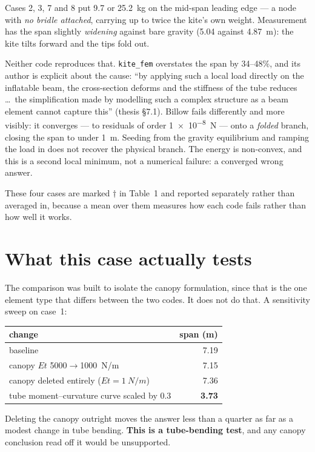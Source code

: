 \documentclass[11pt,a4paper]{article}
\begin{document}
Cases 2, 3, 7 and 8 put \SI{9.7}{} or \SI{25.2}{kg} on the mid-span leading
edge --- a node with \emph{no bridle attached}, carrying up to twice the
kite's own weight. Measurement has the span slightly \emph{widening} against
bare gravity (\SI{5.04}{} against \SI{4.87}{m}): the kite tilts forward and
the tips fold out.

Neither code reproduces that. \texttt{kite\_fem} overstates the span by
34--48\%, and its author is explicit about the cause: ``by applying such a
local load directly on the inflatable beam, the cross-section deforms and the
stiffness of the tube reduces \dots\ the simplification made by modelling such
a complex structure as a beam element cannot capture this'' (thesis \S7.1).
Billow fails differently and more visibly: it converges --- to residuals of
order \SI{1e-8}{N} --- onto a \emph{folded} branch, closing the span to under
\SI{1}{m}. Seeding from the gravity equilibrium and ramping the load in does
not recover the physical branch. The energy is non-convex, and this is a
second local minimum, not a numerical failure: a converged wrong answer.

These four cases are marked $\dagger$ in Table~1 and reported separately
rather than averaged in, because a mean over them measures how each code
fails rather than how well it works.

\clearpage
\section{What this case actually tests}
\label{sec:what}

The comparison was built to isolate the canopy formulation, since that is the
one element type that differs between the two codes. It does not do that. A
sensitivity sweep on case~1:

\begin{center}
\begin{tabular}{lr}
\toprule
change & span (m) \\
\midrule
baseline & 7.19 \\
canopy $Et$ \SI{5000}{}$\rightarrow$\SI{1000}{N/m} & 7.15 \\
canopy deleted entirely ($Et=\SI{1}{N/m}$) & 7.36 \\
tube moment--curvature curve scaled by $0.3$ & \textbf{3.73} \\
\bottomrule
\end{tabular}
\end{center}

Deleting the canopy outright moves the answer less than a quarter as far as a
modest change in tube bending. \textbf{This is a tube-bending test}, and any
canopy conclusion read off it would be unsupported.
\end{document}
